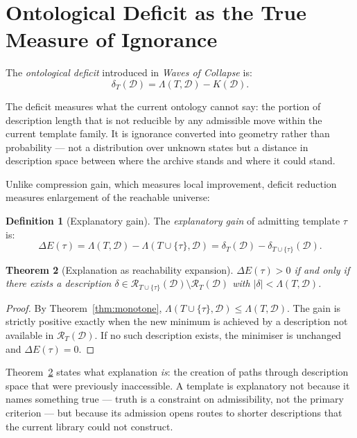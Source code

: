 \documentclass[11pt, a4paper, openany]{book}
\theoremstyle{plain}
\newtheorem{theorem}{Theorem}[chapter]
\theoremstyle{definition}
\newtheorem{definition}[theorem]{Definition}
\theoremstyle{remark}
\begin{document}
\section{Ontological Deficit as the True Measure of Ignorance}

The \emph{ontological deficit} introduced in \emph{Waves of Collapse}
\cite{flyxion2026waves} is:
\begin{equation}
  \delta_T(\mathcal{D}) = \Lambda(T, \mathcal{D}) - K(\mathcal{D}).
  \label{eq:deficit}
\end{equation}

The deficit measures what the current ontology cannot say: the portion of
description length that is not reducible by any admissible move within the
current template family.
It is ignorance converted into geometry rather than probability --- not
a distribution over unknown states but a distance in description space
between where the archive stands and where it could stand.

Unlike compression gain, which measures local improvement, deficit reduction
measures enlargement of the reachable universe:

\begin{definition}[Explanatory gain]
  The \emph{explanatory gain} of admitting template $\tau$ is:
  \[
    \Delta E(\tau) = \Lambda(T, \mathcal{D}) - \Lambda(T \cup \{\tau\}, \mathcal{D})
    = \delta_T(\mathcal{D}) - \delta_{T \cup \{\tau\}}(\mathcal{D}).
  \]
\end{definition}

\begin{theorem}[Explanation as reachability expansion]
  \label{thm:explanation}
  $\Delta E(\tau) > 0$ if and only if
  there exists a description
  $\delta \in \mathcal{R}_{T \cup \{\tau\}}(\mathcal{D})
  \setminus \mathcal{R}_T(\mathcal{D})$
  with $|\delta| < \Lambda(T, \mathcal{D})$.
\end{theorem}

\begin{proof}
  By Theorem~\ref{thm:monotone}, $\Lambda(T \cup \{\tau\}, \mathcal{D}) \leq \Lambda(T, \mathcal{D})$.
  The gain is strictly positive exactly when the new minimum is achieved
  by a description not available in $\mathcal{R}_T(\mathcal{D})$.
  If no such description exists, the minimiser is unchanged and $\Delta E(\tau) = 0$.
\end{proof}

Theorem~\ref{thm:explanation} states what explanation \emph{is}:
the creation of paths through description space that were previously
inaccessible.
A template is explanatory not because it names something true ---
truth is a constraint on admissibility, not the primary criterion ---
but because its admission opens routes to shorter descriptions
that the current library could not construct.
\end{document}

